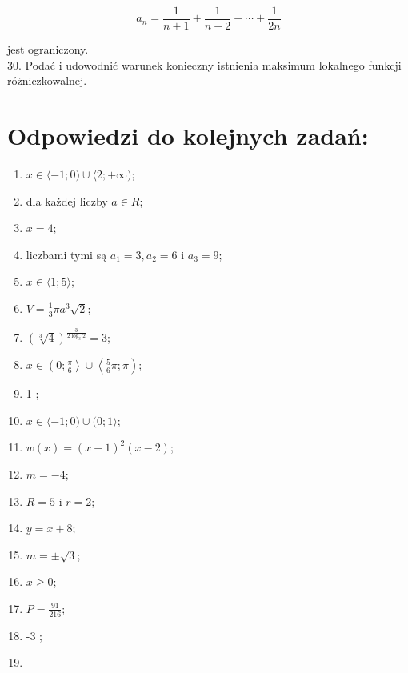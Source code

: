 \documentclass[10pt]{article}
\begin{document}
\[
a_{n}=\frac{1}{n+1}+\frac{1}{n+2}+\cdots+\frac{1}{2 n}
\]

jest ograniczony.\\
30. Podać i udowodnić warunek konieczny istnienia maksimum lokalnego funkcji różniczkowalnej.

\section*{Odpowiedzi do kolejnych zadań:}
\begin{enumerate}
  \item \(x \in\langle-1 ; 0) \cup\langle 2 ;+\infty)\);
  \item dla każdej liczby \(a \in R\);
  \item \(x=4\);
  \item liczbami tymi są \(a_{1}=3, a_{2}=6\) i \(a_{3}=9\);
  \item \(x \in\langle 1 ; 5\rangle\);
  \item \(V=\frac{1}{3} \pi a^{3} \sqrt{2}\);
  \item \((\sqrt[3]{4})^{\frac{3}{2 \log _{3} 2}}=3\);
  \item \(x \in\left(0 ; \frac{\pi}{6}\right\rangle \cup\left\langle\frac{5}{6} \pi ; \pi\right)\);
  \item 1 ;
  \item \(x \in\langle-1 ; 0) \cup(0 ; 1\rangle\);
  \item \(w(x)=(x+1)^{2}(x-2)\);
  \item \(m=-4\);
  \item \(R=5\) i \(r=2\);
  \item \(y=x+8\);
  \item \(m= \pm \sqrt{3}\);
  \item \(x \geqslant 0\);
  \item \(P=\frac{91}{216}\);
  \item -3 ;
  \item 
\end{enumerate}
\end{document}
